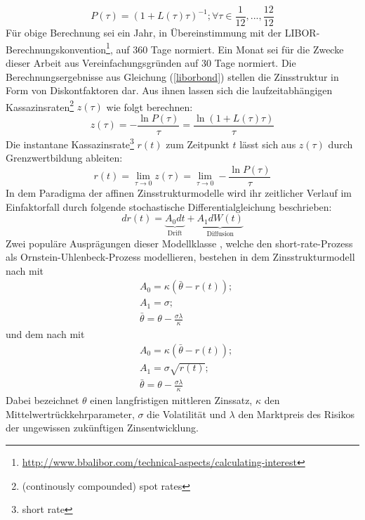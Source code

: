 \documentclass[12pt,a4paper,headsepline,bibliography=totoc,listof=totoc,headinclude=false,footinclude=false,BCOR5mm]{scrreprt} %
\begin{document}
\begin{equation}\label{liborbond}
P(\tau) = \left( 1+L(\tau)\tau \right)^{-1}; \forall \tau \in \frac{1}{12}, ... , \frac{12}{12}
\end{equation}
F{\"u}r obige Berechnung sei ein Jahr, in {\"U}bereinstimmung mit der LIBOR-Berechnungs\-konvention\footnote{\url{http://www.bbalibor.com/technical-aspects/calculating-interest}}, auf 360 Tage normiert. Ein Monat sei f{\"u}r die Zwecke dieser Arbeit aus Vereinfachungsgr{\"u}nden auf 30 Tage normiert. 
Die Berechnungsergebnisse aus Gleichung (\ref{liborbond}) stellen die Zinsstruktur in Form von Diskontfaktoren dar. Aus ihnen lassen sich die laufzeitabh{\"a}ngigen Kassazinsraten\footnote{(continously compounded) spot rates} $z(\tau)$ wie folgt berechnen:
\begin{equation}\label{kassa}
z(\tau) =  - \frac{\ln P(\tau)}{\tau} =  \frac{\ln ( 1 + L(\tau)\tau)}{\tau} 
 \end{equation}
Die instantane Kassazinsrate\footnote{short rate} $r(t)$ zum Zeitpunkt $t$ l{\"a}sst sich aus $z(\tau)$ durch Grenzwertbildung ableiten:
\begin{equation}\label{short}
r(t) =  \lim_{\tau \to 0} z(\tau) =   \lim_{\tau \to 0} - \frac{\ln P(\tau)}{\tau}
 \end{equation}
In dem Paradigma der affinen Zinsstrukturmodelle wird ihr zeitlicher Verlauf im Einfaktorfall durch folgende stochastische Differentialgleichung beschrieben:
\begin{equation}\label{shortprocess}
dr(t) = \underbrace{A_{0}dt}_{\text{Drift}} + \underbrace{A_{1}dW(t)}_{\text{Diffusion}}
 \end{equation}
Zwei popul{\"a}re Auspr{\"a}gungen dieser Modellklasse  \cite[S. 16]{Bolder2001}, welche den short-rate-Prozess als Ornstein-Uhlenbeck-Prozess modellieren, bestehen in dem Zinsstrukturmodell nach \cite{Vasicek1977} mit 
\begin{equation}\label{vasi}\begin{split}
& A_{0} = \kappa (\bar{\theta} - r(t)) ; \\ & A_{1} = \sigma; \\ & \bar{\theta}=\theta - \frac{\sigma\lambda}{\kappa}
 \end{split} \end{equation}
und dem nach \cite{Cox1985} mit
\begin{equation}\label{cox}\begin{split}
& A_{0} = \kappa (\bar{\theta} - r(t)) ; \\ & A_{1} = \sigma\sqrt{r(t)}; \\ & \bar{\theta}=\theta - \frac{\sigma\lambda}{\kappa}
\end{split} \end{equation} Dabei bezeichnet $\theta$ einen langfristigen mittleren Zinssatz, $\kappa$ den Mittelwertr{\"u}ckkehrparameter, $\sigma$ die Volatilit{\"a}t und $\lambda$ den Marktpreis des Risikos der ungewissen zuk{\"u}nftigen Zinsentwicklung.
\end{document}
